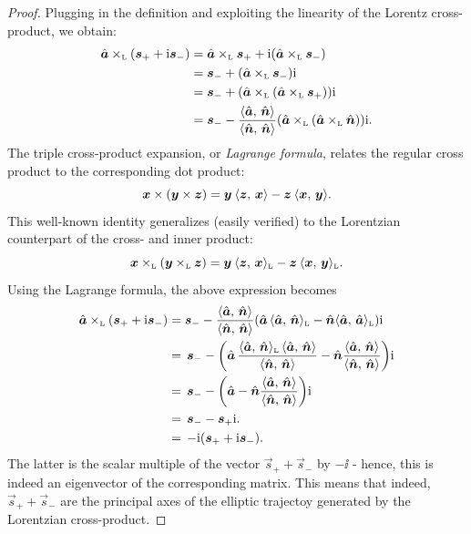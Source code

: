 \begin{proof}
    Plugging in the definition and exploiting the linearity of the Lorentz cross-product, we obtain:
    \begin{equation*}
        \begin{split}
            \lorcrossp{\uvec{a}}{\qty(\vec{s}_+ + \ii\vec{s}_-)} 
            &= \lorcrossp{\uvec{a}}{\vec{s}_+} +
        \ii\qty(\lorcrossp{\uvec{a}}{\vec{s}_-}) \\
            &= \vec{s}_- + \qty(\lorcrossp{\uvec{a}}{\vec{s}_-})\ii \\ 
            &=\vec{s}_- +  \qty(\lorcrossp{\uvec{a}}{\qty(\lorcrossp{\uvec{a}}{\vec{s}_+})})\ii \\
            &=\vec{s}_- -  \frac{ \inner{\uvec{a}}{\uvec{n}}}{ \inner{\uvec{n}}{\uvec{n}} }\qty(\lorcrossp{\uvec{a}}{\qty(\lorcrossp{\uvec{a}}{\uvec{n}})})\ii.  \\
        \end{split}
    \end{equation*}
    The triple cross-product expansion, or \emph{Lagrange formula}, relates the regular cross product to the corresponding dot product:
    \begin{equation}
     \vec{x}\times\qty(\vec{y}\times\vec{z}) = \vec{y}\:\inner{\vec{z}}{\vec{x}} - \vec{z}\:\inner{\vec{x}}{\vec{y}}.
    \end{equation}
    This well-known identity generalizes (easily verified) to the Lorentzian counterpart of the cross- and inner product:
    \begin{equation}
         \lorcrossp{\vec{x}}{\qty(\lorcrossp{\vec{y}}{\vec{z}})} 
       = \vec{y}\:\lorinner{\vec{z}}{\vec{x}} - \vec{z}\:\lorinner{\vec{x}}{\vec{y}}.
    \end{equation}
    Using the Lagrange formula, the above expression becomes
    \begin{equation*}
        \begin{split}
            \lorcrossp{\uvec{a}}{\qty(\vec{s}_+ + \ii\vec{s}_-)} &= 
                \vec{s}_- - \frac{ \inner{\uvec{a}}{\uvec{n}} }{ \inner{\uvec{n}}{\uvec{n}} }\qty(\uvec{a}\,\lorinner{\uvec{a}}{\uvec{n}} - \uvec{n}\lorinner{\uvec{a}}{\uvec{a}})\ii \\
                & =\, \vec{s}_- - \qty(\uvec{a}\,\frac{ \lorinner{\uvec{a}}{\uvec{n}} \, \inner{\uvec{a}}{\uvec{n}} }{ \inner{\uvec{n}}{\uvec{n}} } - \uvec{n}\frac{ \inner{\uvec{a}}{\uvec{n}} }{ \inner{\uvec{n}}{\uvec{n}} })\ii \\
                & =\, \vec{s}_- - \qty(\uvec{a} - \uvec{n}\frac{ \inner{\uvec{a}}{\uvec{n}} }{ \inner{\uvec{n}}{\uvec{n}} })\ii \\
                & =\, \vec{s}_- - \vec{s}_+\ii. \\
                & =\, -\ii(\vec{s}_+ + \ii\vec{s}_-). 
        \end{split}
    \end{equation*}
    The latter is the scalar multiple of the vector \(\vec{s}_+ + \vec{s}_-\) by \(-\ii\) - hence, this is indeed an eigenvector of the corresponding matrix. This means that indeed, \(\vec{s}_+ + \vec{s}_-\) are the principal axes of the elliptic trajectoy generated by the Lorentzian cross-product.
\end{proof}

